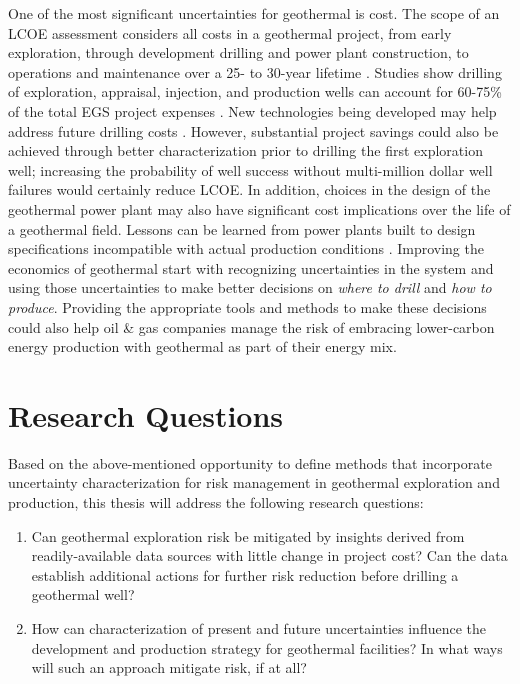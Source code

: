 One of the most significant uncertainties for geothermal is cost. The scope of an LCOE assessment considers all costs in a geothermal project, from early exploration, through development drilling and power plant construction, to operations and maintenance over a 25- to 30-year lifetime \citep{beckers_introducing_2013, entingh_volume_2006, tester_economic_1990}. Studies show drilling of exploration, appraisal, injection, and production wells can account for 60-75\% of the total EGS project expenses \citep{lukawski_uncertainty_2016, petty_synergies_2009}. New technologies being developed may help address future drilling costs \citep{lowry_geovision_2017,nrel_2020_2020}. However, substantial project savings could also be achieved through better characterization prior to drilling the first exploration well; increasing the probability of well success without multi-million dollar well failures would certainly reduce LCOE. In addition, choices in the design of the geothermal power plant may also have significant cost implications over the life of a geothermal field. Lessons can be learned from power plants built to design specifications incompatible with actual production conditions \citep[e.g.,][]{manente_hybrid_2011}. Improving the economics of geothermal start with recognizing uncertainties in the system and using those uncertainties to make better decisions on \textit{where to drill} and \textit{how to produce}. Providing the appropriate tools and methods to make these decisions could also help oil \& gas companies manage the risk of embracing lower-carbon energy production with geothermal as part of their energy mix.

\section{Research Questions}\label{ch1:researchqs}
Based on the above-mentioned opportunity to define methods that incorporate uncertainty characterization for risk management in geothermal exploration and production, this thesis will address the following research questions:

\begin{enumerate}
  \item Can geothermal exploration risk be mitigated by insights derived from readily-available data sources with little change in project cost? Can the data establish additional actions for further risk reduction before drilling a geothermal well? 
  \item How can characterization of present and future uncertainties influence the development and production strategy for geothermal facilities? In what ways will such an approach mitigate risk, if at all?
\end{enumerate}

